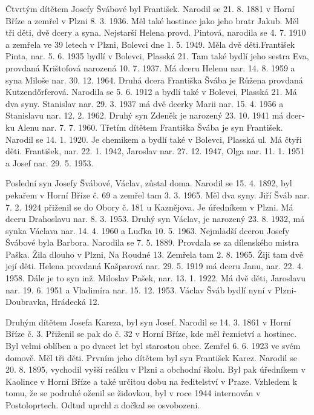 \documentclass[../dejiny-rodu-prusiku.tex]{subfiles}
\begin{document}
Čtvrtým dítětem Josefy Švábové byl František. Narodil se 21. 8. 1881 v Horní Bříze a zemřel v Plzni 8. 3. 1936. Měl také hostinec jako jeho bratr Jakub. Měl tři děti, dvě dcery a syna. Nejstarší Helena provd. Pintová, naro­dila se 4. 7. 1910 a zemřela ve 39 letech v Plzni, Bolevci dne 1. 5. 1949. Měla dvě děti.František Pinta, nar. 5. 6. 1935 bydlí v Bolevci, Plasská 21. Tam také bydlí jeho sestra Eva, provdaná Krištofová narozená 10. 7. 1937. Má dceru Helenu nar. 14. 8. 1959 a syna Miloše nar. 30. 12. 1964. Druhá dcera Františka Švába je Růžena provdaná Kutzendőrferová. Narodila se 5. 6. 1912 a bydlí také v Bolevci, Plasská 21. Má dva syny. Stanislav nar. 29. 3. 1937 má dvě dcerky Marii nar. 15. 4. 1956 a Stanislavu nar. 12. 2. 1962. Druhý syn Zdeněk je narozený 23. 10. 1941 má dcer­ku Alenu nar. 7. 7. 1960. Třetím dítětem Františka Švába je syn František. Narodil se 14. 1. 1920. Je chemikem a byd­lí také v Bolevci, Plasská ul. Má čtyři děti. František, nar. 22. 1. 1942, Jaroslav nar. 27. 12. 1947, Olga nar. 11. 1. 1951 a Josef nar. 29. 5. 1953.

Poslední syn Josefy Švábové, Václav, zůstal doma. Narodil se 15. 4. 1892, byl pekařem v Horní Bříze č. 69 a zemřel tam 3. 3. 1965. Měl dva syny. Jiří Šváb nar. 7. 2. 1924 přiženil se do Obory č. 181 u Kaznějova. Je úředníkem v Plzni. Má dceru Drahoslavu nar. 8. 3. 1953.  Druhý syn Václav, je narozený 23. 8. 1932, má synka Václava nar. 14. 4. 1960 a Luďka 10. 5. 1963. Nejmladší dcerou Josefy Švábové byla Barbora. Narodila se 7. 5. 1889. Provdala se za dílenského mistra Paška. Žila dlouho v Plzni, Na Roudné 13. Zemřela tam 2. 8. 1965. Žiji tam dvě její děti. Helena provdaná Kašparová nar. 29. 5. 1919 má dceru Janu, nar. 22. 4. 1958. Dále je to syn inž. Miloslav Pašek, nar. 13. 1. 1922. Má dvě děti, Jaroslavu nar. 19. 6. 1951 a Vladimíra nar. 15. 12. 1953. Václav Šváb bydlí nyní v Plzni-Doubravka, Hrádecká 12.

Druhým dítětem Josefa Kareza, byl syn Josef. Narodil se 14. 3. 1861 v Horní Bříze č. 3.  Přiženil se pak do č. 32 v Horní Bříze, kde měl řeznictví a hostinec. Byl velmi oblíben a po dvacet let byl starostou obce. Zemřel 6. 6. 1923 ve svém domově. Měl tři děti. Prvním jeho dítětem byl syn František Karez. Narodil se 20. 8. 1895, vychodil vyšší reálku v Plzni a obchodní ško­lu. Byl pak úředníkem v Kaolince v Horní Bříze a také určitou dobu na ředitelství v Praze. Vzhledem k tomu, že se podruhé oženil se židovkou, byl v roce 1944 interno­ván v Postoloprtech. Odtud uprchl a dočkal se osvobozeni.
\end{document}
